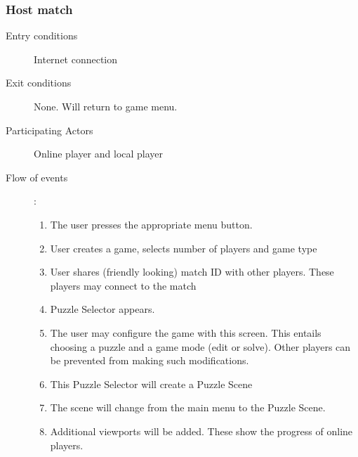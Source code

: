 \documentclass[12pt]{article}
\begin{document}
    \subsubsection{Host match}
    \begin{description}
        \item[Entry conditions] Internet connection
        \item[Exit conditions] None. Will return to game menu.
        \item[Participating Actors] Online player and local player
        \item[Flow of events]:
            \begin{enumerate}
                \item The user presses the appropriate menu button.
                \item User creates a game, selects number of players and game
                    type
                \item User shares (friendly looking) match ID with other
                    players. These players may connect to the match
                \item Puzzle Selector appears.
                \item The user may configure the game with this screen.
                    This
                    entails choosing a puzzle and a game mode (edit or solve).
                    Other players can be prevented from making such
                    modifications.
                \item This Puzzle Selector will create a Puzzle Scene
                \item The scene will change from the main menu to the Puzzle
                    Scene.
                \item Additional viewports will be added. These show the
                    progress of online players.

            \end{enumerate}
    \end{description}

\end{document}
